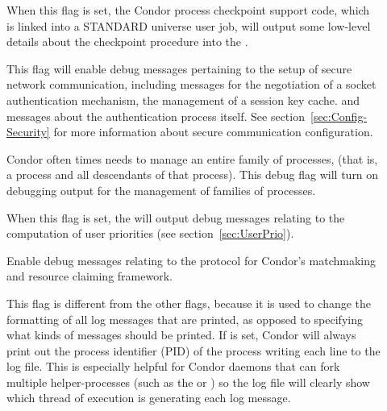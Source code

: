 \begin{description}
\begin{description}
  \item[] \label{dflag:ckpt}
    When this flag is set,
    the Condor process checkpoint support code, which is linked into a STANDARD 
    universe user job, will output some low-level details about the checkpoint
    procedure into the .

  \item[] \label{dflag:security}
    This flag will enable debug messages pertaining to the setup of 
    secure network communication, 
    including messages for the negotiation of a socket 
    authentication mechanism, the management of a session key cache.
    and messages about the authentication process itself.  See
    section~\ref{sec:Config-Security} for more information about
    secure communication configuration.

  \item[] \label{dflag:procfamily}
    Condor often times needs to manage an entire family of processes, (that
    is, a 
    process and all descendants of that process).  This debug flag will 
    turn on debugging output for the management of families of processes.

  \item[] \label{dflag:accountant}
    When this flag is set,
    the  will output debug messages relating to the computation
    of user priorities (see section~\ref{sec:UserPrio}).

  \item[] \label{dflag:protocol}
    Enable debug messages relating to the protocol for Condor's matchmaking and
    resource claiming framework.
    
  \item[] \label{dflag:pid}
    This flag is different from the other flags, because it is
    used to change the formatting of all log messages that are printed,
    as opposed to specifying what kinds of messages should be printed.
    If  is set, Condor will always print out the process
    identifier (PID) of the process writing each line to the log file.
    This is especially helpful for Condor daemons that can fork
    multiple helper-processes (such as the  or
    ) so the log file will clearly show which thread
    of execution is generating each log message.
    

\end{description}
\end{description}
